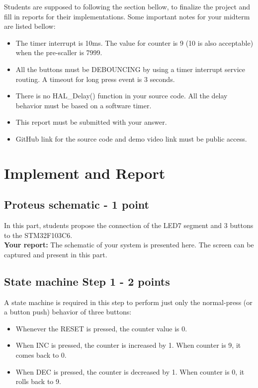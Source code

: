 Students are supposed to following the section bellow, to finalize the project and fill in reports for their implementations. Some important notes for your midterm are listed bellow:

\begin{itemize}
    \item The timer interrupt is 10ms. The value for counter is 9 (10 is also acceptable) when the pre-scaller is 7999.
    \item All the buttons must be DEBOUNCING by using a timer interrupt service routing. A timeout for long press event is 3 seconds.
    \item There is no HAL\_Delay() function in your source code. All the delay behavior must be based on a software timer.
    \item This report must be submitted with your answer.
    \item GitHub link for the source code and demo video link must be public access.
\end{itemize}

\section{Implement and Report}

\subsection{Proteus schematic - 1 point}
In this part, students propose the connection of the LED7 segment and 3 buttons to the STM32F103C6.\\

\textbf{Your report: } The schematic of your system is presented here. The screen can be captured and present in this part.\\


\subsection{State machine Step 1 - 2 points}
A state machine is required in this step to perform just only the normal-press (or a button push) behavior of three buttons:

\begin{itemize}
    \item Whenever the RESET is pressed, the counter value is 0.
    \item When INC is pressed, the counter is increased by 1. When counter is 9, it comes back to 0.
    \item When DEC is pressed, the counter is decreased by 1. When counter is 0, it rolls back to 9.
\end{itemize}

